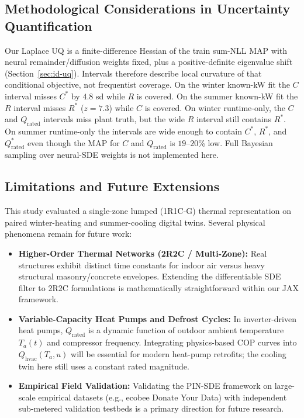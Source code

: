 \documentclass[11pt,letterpaper]{article}
\begin{document}
\subsection{Methodological Considerations in Uncertainty Quantification}
\label{sec:discussion-uq}
Our Laplace UQ is a finite-difference Hessian of the train sum-NLL MAP with neural remainder/diffusion weights fixed, plus a positive-definite eigenvalue shift (Section~\ref{sec:id-uq}). Intervals therefore describe local curvature of that conditional objective, not frequentist coverage. On the winter known-kW fit the $C$ interval misses $C^*$ by $4.8$ sd while $R$ is covered. On the summer known-kW fit the $R$ interval misses $R^*$ ($z=7.3$) while $C$ is covered. On winter runtime-only, the $C$ and $Q_\mathrm{rated}$ intervals miss plant truth, but the wide $R$ interval still contains $R^*$. On summer runtime-only the intervals are wide enough to contain $C^*$, $R^*$, and $Q_\mathrm{rated}^*$ even though the MAP for $C$ and $Q_\mathrm{rated}$ is $19$--$20$\% low. Full Bayesian sampling over neural-SDE weights is not implemented here.

\subsection{Limitations and Future Extensions}
\label{sec:discussion-limits}
This study evaluated a single-zone lumped (1R1C-G) thermal representation on paired winter-heating and summer-cooling digital twins. Several physical phenomena remain for future work:
\begin{itemize}
\item \textbf{Higher-Order Thermal Networks (2R2C / Multi-Zone):} Real structures exhibit distinct time constants for indoor air versus heavy structural masonry/concrete envelopes. Extending the differentiable SDE filter to 2R2C formulations is mathematically straightforward within our JAX framework.
\item \textbf{Variable-Capacity Heat Pumps and Defrost Cycles:} In inverter-driven heat pumps, $Q_\mathrm{rated}$ is a dynamic function of outdoor ambient temperature $T_a(t)$ and compressor frequency. Integrating physics-based COP curves into $Q_\mathrm{hvac}(T_a, u)$ will be essential for modern heat-pump retrofits; the cooling twin here still uses a constant rated magnitude.
\item \textbf{Empirical Field Validation:} Validating the PIN-SDE framework on large-scale empirical datasets (e.g., ecobee Donate Your Data) with independent sub-metered validation testbeds is a primary direction for future research.
\end{itemize}
\end{document}
